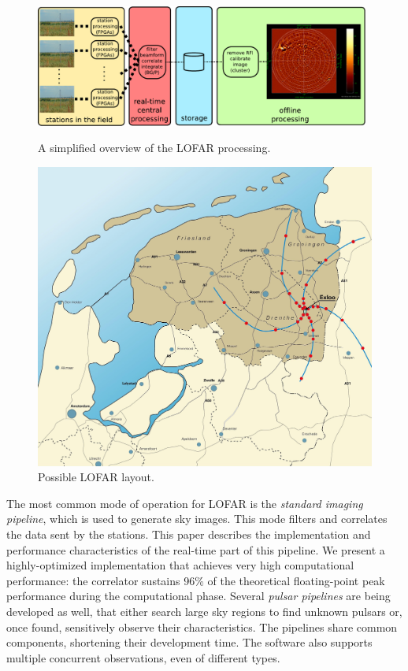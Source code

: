 \documentclass{sig-alternate}
\begin{document}
\begin{figure}
\begin{minipage}[b]{11cm}
\includegraphics[width=11cm]{lofar-overview.pdf}
\caption{A simplified overview of the LOFAR processing.}
\label{fig:lofar-overview}
\end{minipage}
\hfill
\begin{minipage}[b]{56mm}
\includegraphics[width=\columnwidth]{map.jpg}
\caption{Possible LOFAR layout.}
\label{fig:map}
\end{minipage}
\end{figure}

The most common mode of operation for LOFAR is the 
\emph{standard imaging pipeline}, which is used to generate sky images.
This mode filters and correlates the data sent by the stations.
This paper describes the implementation and
performance characteristics of the real-time part of this pipeline.
We present a highly-optimized implementation that achieves very high
computational performance: the correlator sustains 96\% of the theoretical
floating-point peak performance during the computational phase.
Several \emph{pulsar pipelines\/} are being developed as well, that either
search large sky regions to find unknown pulsars or, once found, sensitively
observe their characteristics.
The pipelines share common components, shortening their development time. 
The software also supports multiple concurrent observations, even of different
types.
\end{document}
